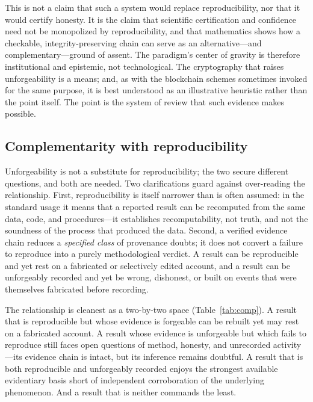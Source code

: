 \documentclass[11pt]{article}
\begin{document}
This is not a claim that such a system would replace reproducibility, nor that it would
certify honesty. It is the claim that scientific certification and confidence need not
be monopolized by reproducibility, and that mathematics shows how a checkable,
integrity-preserving chain can serve as an alternative---and complementary---ground of
assent. The paradigm's center of gravity is therefore institutional and epistemic, not
technological. The cryptography that raises unforgeability is a means; and, as with the
blockchain schemes sometimes invoked for the same purpose, it is best understood as an
illustrative heuristic rather than the point itself. The point is the system of review
that such evidence makes possible.

\subsection{Complementarity with reproducibility}

Unforgeability is not a substitute for reproducibility; the two secure different
questions, and both are needed. Two clarifications guard against over-reading the
relationship. First, reproducibility is itself narrower than is often assumed: in the
standard usage it means that a reported result can be recomputed from the same data,
code, and procedures---it establishes recomputability, not truth, and not the
soundness of the process that produced the data. Second, a verified evidence chain
reduces a \emph{specified class} of provenance doubts; it does not convert a failure
to reproduce into a purely methodological verdict. A result can be reproducible and yet
rest on a fabricated or selectively edited account, and a result can be unforgeably
recorded and yet be wrong, dishonest, or built on events that were themselves fabricated
before recording.

The relationship is cleanest as a two-by-two space (Table~\ref{tab:comp}). A result that
is reproducible but whose evidence is forgeable can be rebuilt yet may rest on a
fabricated account. A result whose evidence is unforgeable but which fails to reproduce
still faces open questions of method, honesty, and unrecorded activity---its evidence
chain is intact, but its inference remains doubtful. A result that is both reproducible
and unforgeably recorded enjoys the strongest available evidentiary basis short of
independent corroboration of the underlying phenomenon. And a result that is neither
commands the least.
\end{document}
